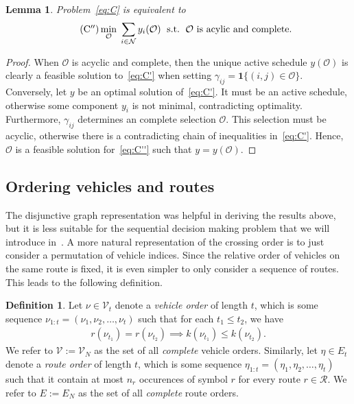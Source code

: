 \documentclass[a4paper]{report}
\theoremstyle{definition}
\newtheorem{define}{Definition}[chapter]
\theoremstyle{plain}
\newtheorem{lemma}{Lemma}[chapter]
\begin{document}
\begin{lemma}\label{lemma:disj-graph-optimization}
  Problem~\eqref{eq:C} is equivalent to
  \begin{align}
    \label{eq:C''}
    \tag{$\mathrm{C}^{\prime\prime}$}
    \min_{\mathcal{O}} \; \sum_{i \in \mathcal{N}} y_i(\mathcal{O}) \; \text{ s.t. } \, \mathcal{O} \text{ is acylic and complete. }
  \end{align}
\end{lemma}
\begin{proof}
  When $\mathcal{O}$ is acyclic and complete, then the unique active schedule
  $y(\mathcal{O})$ is clearly a feasible solution to~\eqref{eq:C'} when setting
  $\gamma_{ij} = \mathbf{1} \{ (i,j) \in \mathcal{O} \}$.
  Conversely, let $y$ be an optimal solution of~\eqref{eq:C'}. It must be an active
  schedule, otherwise some component $y_i$ is not minimal, contradicting
  optimality. Furthermore, $\gamma_{ij}$ determines an complete selection
  $\mathcal{O}$. This selection must be acyclic, otherwise there is a
  contradicting chain of inequalities in~\eqref{eq:C'}.
  Hence, $\mathcal{O}$ is a feasible solution
  for~\eqref{eq:C''} such that $y = y(\mathcal{O})$.
\end{proof}

\subsection{Ordering vehicles and routes}

The disjunctive graph representation was helpful in deriving the results above,
but it is less suitable for the sequential decision making problem that we will
introduce in~.
%
A more natural representation of the crossing order is to just consider a
permutation of vehicle indices.
%
Since the relative order of vehicles on the same route is fixed, it is even
simpler to only consider a sequence of routes.
%
This leads to the following definition.

\begin{define}
  Let $\nu \in \mathcal{V}_t$ denote a \emph{vehicle order} of length $t$,
  which is some sequence $\nu_{1:t} = (\nu_1, \nu_2, \dots, \nu_t)$ such that for each
  $t_1 \leq t_2$, we have
  \begin{align}\label{eq:order-respecting}
    r(\nu_{t_1}) = r(\nu_{t_2}) \implies k(\nu_{t_1}) \leq k(\nu_{t_2}) .
  \end{align}
  We refer to $\mathcal{V} := \mathcal{V}_N$ as the set of all \emph{complete}
  vehicle orders.
  Similarly, let $\eta \in E_t$ denote a \emph{route order} of length $t$, which is some
  sequence $\eta_{1:t} = (\eta_1, \eta_2, \dots, \eta_t)$ such that it contain at most
  $n_r$ occurences of symbol $r$ for every route $r \in \mathcal{R}$. We refer to
  $E := E_N$ as the set of all \emph{complete} route orders.
\end{define}
\end{document}
